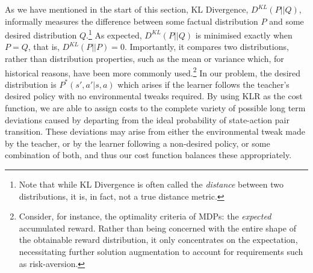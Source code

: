 As we have mentioned in the start of this section, KL Divergence,
$D^{KL}(P||Q)$, informally measures the difference between some
factual distribution $P$ and some desired distribution
$Q$.\footnote{Note that while KL Divergence is often called the
  \emph{distance} between two distributions, it is, in fact, not a
  true distance metric.}  As expected, $D^{KL}(P||Q)$ is minimised
exactly when $P=Q$, that is, $D^{KL}(P||P)=0$. Importantly, it
compares two distributions, rather than distribution properties, such
as the mean or variance which, for historical reasons, have been more commonly
used.\footnote{Consider, for instance, the optimality criteria of
  MDPs: the {\em expected} accumulated reward. Rather than being
  concerned with the entire shape of the obtainable reward
  distribution, it only concentrates on the expectation, necessitating
  further solution augmentation to account for requirements such as
  risk-aversion.}  In our problem, the desired distribution is
$P^*(s',a'|s,a)$ which arises if the learner follows the teacher's
desired policy with no environmental tweaks required.  By using KLR as
the cost function, we are able to assign costs to the complete variety
of possible long term deviations caused by departing from the ideal
probability of state-action pair transition.  These deviations may
arise from either the environmental tweak made by the teacher, or by
the learner following a non-desired policy, or some combination of
both, and thus our cost function balances these appropriately.





